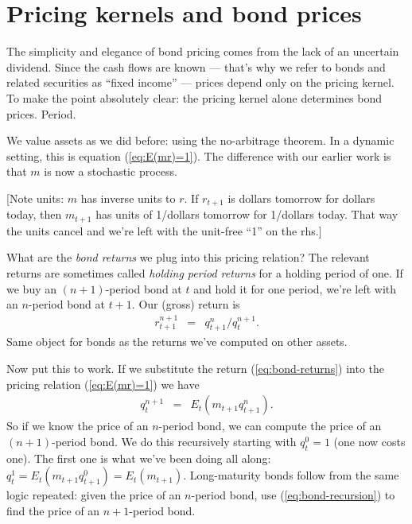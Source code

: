 \documentclass[11pt]{article}
\begin{document}
\section{Pricing kernels and bond prices}

The simplicity and elegance of bond pricing comes
from the lack of an uncertain dividend.
Since the cash flows are known ---
that's why we refer to bonds and related securities as ``fixed income'' ---
prices depend only on the pricing kernel.
To make the point absolutely clear:  the pricing kernel alone determines
bond prices.  Period.


We value assets as we did before:  using the no-arbitrage theorem.
In a dynamic setting, this is equation (\ref{eq:E(mr)=1}).
The difference with our earlier work is that $m$ is now a stochastic process.

[Note units:  $m$ has inverse units to $r$.
If $r_{t+1}$ is dollars tomorrow for dollars today,
then $m_{t+1}$ has units of 1/dollars tomorrow
for 1/dollars today.
That way the units cancel and we're left with the unit-free ``1'' on the rhs.]

What are the {\it bond returns\/} we plug into this pricing relation?
The relevant returns are sometimes called {\it holding period returns\/}
for a holding period of one.
If we buy an $(n+1)$-period bond at $t$ and hold it for one period,
we're left with an $n$-period bond at $t+1$.
Our (gross) return is
\begin{eqnarray}
        r^{n+1}_{t+1} &=&  q^n_{t+1}/q^{n+1}_t .
        \label{eq:bond-returns}
\end{eqnarray}
Same object for bonds as the returns we've computed on
other assets.


Now put this to work.  If we substitute the return (\ref{eq:bond-returns})
into the pricing relation (\ref{eq:E(mr)=1}) we have
\begin{eqnarray}
    q^{n+1}_t &=& E_t \left( m_{t+1} q^n_{t+1} \right) .
    \label{eq:bond-recursion}
\end{eqnarray}
So if we know the price of an $n$-period bond,
we can compute the price of an $(n+1)$-period bond.
We do this recursively starting with $q^0_t = 1$ (one now costs one).
The first one is what we've been doing all along:
$ q^1_t = E_t (m_{t+1} q^0_{t+1}) = E_t (m_{t+1})$.
Long-maturity bonds follow from the same logic repeated:
given the price of an $n$-period bond,
use (\ref{eq:bond-recursion}) to find the price of an $n+1$-period bond.
\end{document}

